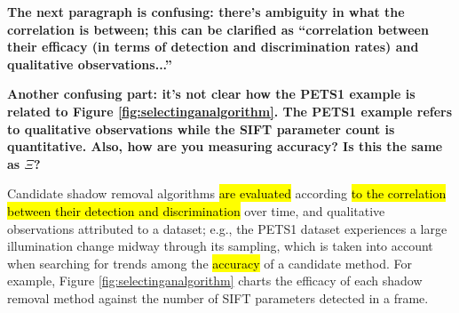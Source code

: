 \documentclass[12pt]{report}
\newcommand{\comment}[1]
           {\par {\bfseries \color{blue} #1 \par}}
\begin{document}
\comment{The next paragraph is confusing: there's ambiguity in what the correlation is between; this can be clarified as ``correlation between their efficacy (in terms of detection and discrimination rates) and qualitative observations...''}
\comment{Another confusing part: it's not clear how the PETS1 example is related to Figure \ref{fig:selectinganalgorithm}.  The PETS1 example refers to qualitative observations while the SIFT parameter count is quantitative.  Also, how are you measuring accuracy? Is this the same as $\Xi$?}

Candidate shadow removal algorithms \hl{are evaluated} according \hl{to the correlation between their detection and discrimination} over time, and qualitative observations attributed to a dataset; e.g., the PETS1 dataset experiences a large illumination change midway through its sampling, which is taken into account when searching for trends among the \hl{accuracy} of a candidate method. For example, Figure \ref{fig:selectinganalgorithm} charts the efficacy of each shadow removal method against the number of SIFT parameters detected in a frame.
\end{document}
